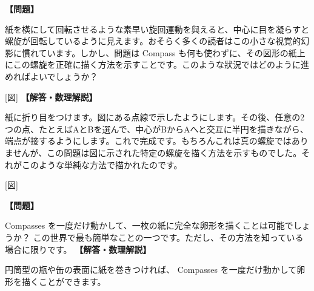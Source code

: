 \documentclass[10pt,a4paper,oneside,openany]{ltjsbook}
\begin{document}
\begin{tcolorbox}[colback=softblue,colframe=primaryblue,title=\textbf{第 183 問：螺旋を描く （原題: DRAWING A SPIRAL.）},arc=2mm,boxrule=1pt,breakable]
\textbf{【問題】}\par\vspace{0.3em}
紙を橫にして回転させるような素早い旋回運動を與えると、中心に目を凝らすと螺旋が回転しているように見えます。おそらく多くの読者はこの小さな視覚的幻影に慣れています。しかし、問題は Compass も何も使わずに、その図形の紙上にこの螺旋を正確に描く方法を示すことです。このような狀況ではどのように進めればよいでしょうか？

[図]
\tcblower
\textbf{【解答・数理解説】}\par\vspace{0.3em}
紙に折り目をつけます。図にある点線で示したようにします。その後、任意の2つの点、たとえばAとBを選んで、中心がBからAへと交互に半円を描きながら、端点が接するようにします。これで完成です。もちろんこれは真の螺旋ではありませんが、この問題は図に示された特定の螺旋を描く方法を示すものでした。それがこのような単純な方法で描かれたのです。

[図]
\end{tcolorbox}

\begin{tcolorbox}[colback=softblue,colframe=primaryblue,title=\textbf{第 184 問：卵形を一度に描く方法 （原題: HOW TO DRAW AN OVAL.）},arc=2mm,boxrule=1pt,breakable]
\textbf{【問題】}\par\vspace{0.3em}
Compasses を一度だけ動かして、一枚の紙に完全な卵形を描くことは可能でしょうか？ この世界で最も簡単なことの一つです。ただし、その方法を知っている場合に限りです。
\tcblower
\textbf{【解答・数理解説】}\par\vspace{0.3em}
円筒型の瓶や缶の表面に紙を巻きつければ、 Compasses を一度だけ動かして卵形を描くことができます。
\end{tcolorbox}
\end{document}
